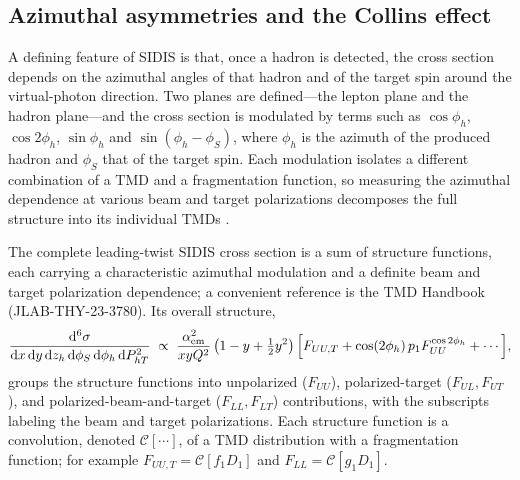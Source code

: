 \FloatBarrier

\subsection{Azimuthal asymmetries and the Collins effect}
\label{subsec:collins}

A defining feature of SIDIS is that, once a hadron is detected, the cross section depends
on the azimuthal angles of that hadron and of the target spin around the virtual-photon
direction. Two planes are defined---the lepton plane and the hadron plane---and the
cross section is modulated by terms such as $\cos\phi_{h}$, $\cos 2\phi_{h}$,
$\sin\phi_{h}$ and $\sin(\phi_{h}-\phi_{S})$, where $\phi_{h}$ is the azimuth of the
produced hadron and $\phi_{S}$ that of the target spin. Each modulation isolates a
different combination of a TMD and a fragmentation function, so measuring the azimuthal
dependence at various beam and target polarizations decomposes the full structure into
its individual TMDs \cite[Ch.~1]{Amsler2018}.

The complete leading-twist SIDIS cross section is a sum of structure functions, each
carrying a characteristic azimuthal modulation and a definite beam and target
polarization dependence; a convenient reference is the TMD Handbook (JLAB-THY-23-3780).
Its overall structure,
\begin{equation}
    \frac{\mathrm{d}^{6}\sigma}
         {\mathrm{d}x\,\mathrm{d}y\,\mathrm{d}z_{h}\,\mathrm{d}\phi_{S}\,
          \mathrm{d}\phi_{h}\,\mathrm{d}P_{hT}^{2}}
    \;\propto\; \frac{\alpha_{\mathrm{em}}^{2}}{x y Q^{2}}
      \left(1 - y + \tfrac{1}{2}y^{2}\right)
      \Bigl[F_{UU,T} + \cos(2\phi_{h})\,p_{1}F_{UU}^{\cos 2\phi_{h}}
      + \cdots\Bigr],
    \label{eq:full-sidis}
\end{equation}
groups the structure functions into unpolarized ($F_{UU}$), polarized-target
($F_{UL},F_{UT}$), and polarized-beam-and-target ($F_{LL},F_{LT}$) contributions, with
the subscripts labeling the beam and target polarizations. Each structure function is a
convolution, denoted $\mathcal{C}[\cdots]$, of a TMD distribution with a fragmentation
function; for example $F_{UU,T}=\mathcal{C}[f_{1}D_{1}]$ and
$F_{LL}=\mathcal{C}[g_{1}D_{1}]$.

